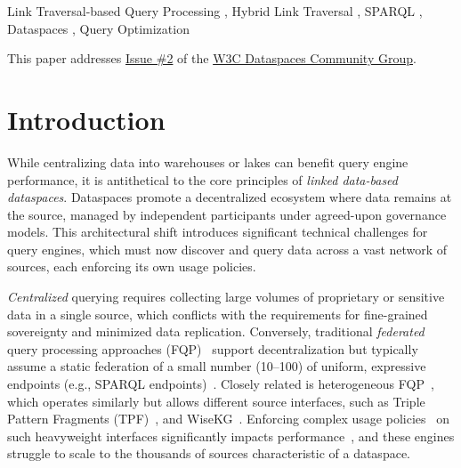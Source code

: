 \documentclass{ceurart}
\theoremstyle{definition}
\begin{document}
\begin{keywords}
  Link Traversal-based Query Processing \sep{}
  Hybrid Link Traversal \sep{}
  SPARQL \sep{}
  Dataspaces \sep{} 
  Query Optimization
\end{keywords}

\maketitle

\noindent This paper addresses \href{https://github.com/w3c-cg/dataspaces/issues/2}{Issue \#2} of the \href{https://www.w3.org/community/dataspaces/}{W3C Dataspaces Community Group}.
\section{Introduction} 
While centralizing data into warehouses or lakes can benefit query engine performance,
it is antithetical to the core principles of \emph{linked data-based dataspaces}.
Dataspaces promote a decentralized ecosystem where data remains at the source, managed by independent participants under agreed-upon governance models.
This architectural shift introduces significant technical challenges for query engines,
which must now discover and query data across a vast network of sources,
each enforcing its own usage policies.

\emph{Centralized} querying requires collecting large volumes of proprietary or sensitive data in a single source, 
which conflicts with the requirements for fine-grained sovereignty and minimized data replication.
Conversely, traditional \emph{federated} query processing approaches (FQP)~\cite{schmidt2011fedbench} support decentralization
but typically assume a static federation of a small number (10–100) of uniform,
expressive endpoints (e.g., SPARQL endpoints)~\cite{dang2023fedshop}.
Closely related is heterogeneous FQP~\cite{cheng2022towards,heling2022federated}, which operates similarly but allows different source interfaces,
such as Triple Pattern Fragments (TPF)~\cite{verborgh2016triple}, and WiseKG~\cite{azzam2021wisekg}.
Enforcing complex usage policies~\cite{esteves2021odrl} on such heavyweight interfaces significantly
impacts performance~\cite{padia2015attribute}, and these engines struggle to scale to the thousands of sources characteristic of a dataspace.
\end{document}
